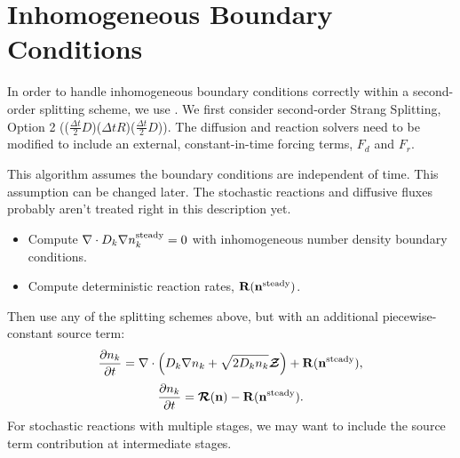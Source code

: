 \documentclass[final]{siamltex}
\def\nb  {{\bf n}}
\def\Rb  {{\bf R}}
\def\mRb {\bm{\mathcal{R}}}
\def\mZb {\bm{\mathcal{Z}}}
\begin{document}
\section{Inhomogeneous Boundary Conditions}
In order to handle inhomogeneous boundary conditions correctly within a second-order
splitting scheme, we use \cite{Einkemmer:2014}.  We first consider second-order
Strang Splitting, Option 2 (($\frac{\Delta t}{2}D$)($\Delta t R$)($\frac{\Delta t}{2}D$)).
The diffusion and reaction solvers need to be modified to include an external, 
constant-in-time forcing terms, $F_d$ and $F_r$.

This algorithm assumes the boundary conditions are independent of time.  This
assumption can be changed later.  The stochastic reactions and diffusive fluxes
probably aren't treated right in this description yet.

\begin{itemize}
\item Compute $\nabla\cdot D_k\nabla n_k^{\rm steady} = 0$ with inhomogeneous number density boundary
conditions.

\item Compute deterministic reaction rates, $\Rb(\nb^{\rm steady})$.
\end{itemize}

Then use any of the splitting schemes above, but with an additional piecewise-constant
source term:
\begin{equation}
\frac{\partial n_k}{\partial t} = \nabla\cdot\left(D_k\nabla n_k + \sqrt{2D_kn_k}\mZb\right) + \Rb(\nb^{\rm steady}),\label{eq:Diffusion_bc}
\end{equation}
\begin{equation}
\frac{\partial n_k}{\partial t} = \mRb(\nb) - \Rb(\nb^{\rm steady}).\label{eq:Reactions_bc}
\end{equation}
For stochastic reactions with multiple stages, we may want to include the source 
term contribution at intermediate stages.



\end{document}
